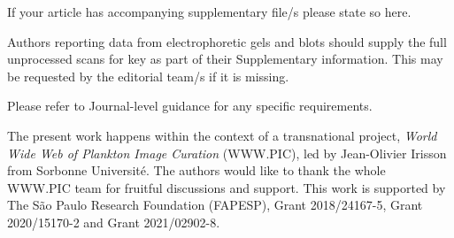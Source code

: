 \documentclass[sn-basic]{sn-jnl}%
\theoremstyle{thmstyleone}%
\theoremstyle{thmstyletwo}%
\theoremstyle{thmstylethree}%
\begin{document}















\backmatter


If your article has accompanying supplementary file/s please state so here. 

Authors reporting data from electrophoretic gels and blots should supply the full unprocessed scans for key as part of their Supplementary information. This may be requested by the editorial team/s if it is missing.

Please refer to Journal-level guidance for any specific requirements.


The present work happens within the context of a transnational project, \textit{World Wide Web of Plankton Image Curation} (WWW.PIC), led by Jean-Olivier Irisson from Sorbonne Université. The authors would like to thank the whole WWW.PIC team for fruitful discussions and support. This work is supported by The São Paulo Research Foundation (FAPESP), Grant 2018/24167-5,  Grant 2020/15170-2 and Grant 2021/02902-8.
\end{document}
